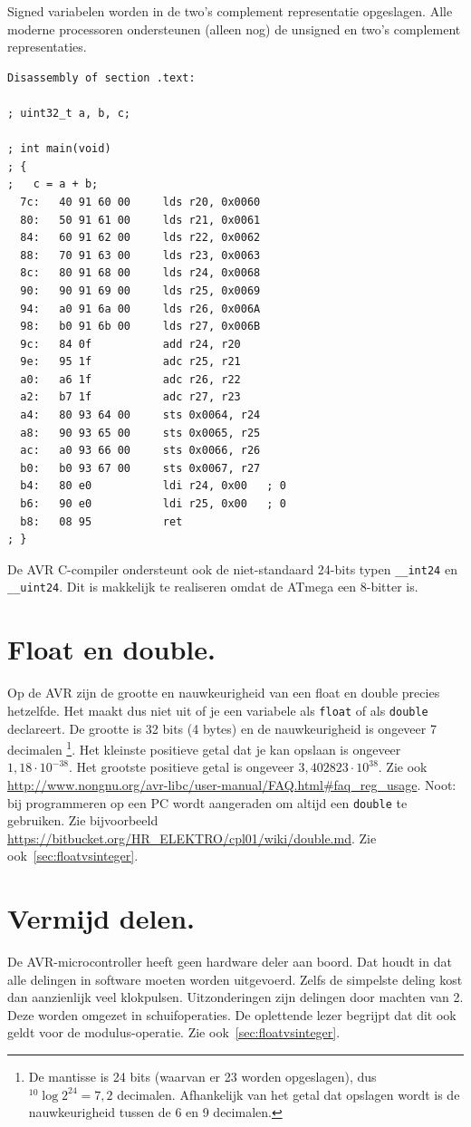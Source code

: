 \documentclass[12pt,a4paper,final,twoside,fleqn]{article}
\def\lstC{\lstinline[style=C]}
\begin{document}
Signed variabelen worden in de two's complement representatie opgeslagen. Alle
moderne processoren ondersteunen (alleen nog) de unsigned en two's complement
representaties.

\newpage
\begin{lstlisting}[style=AVR,caption=32 bits optelling]
Disassembly of section .text:

; uint32_t a, b, c;

; int main(void)
; {
;   c = a + b;
  7c:	40 91 60 00 	lds	r20, 0x0060
  80:	50 91 61 00 	lds	r21, 0x0061
  84:	60 91 62 00 	lds	r22, 0x0062
  88:	70 91 63 00 	lds	r23, 0x0063
  8c:	80 91 68 00 	lds	r24, 0x0068
  90:	90 91 69 00 	lds	r25, 0x0069
  94:	a0 91 6a 00 	lds	r26, 0x006A
  98:	b0 91 6b 00 	lds	r27, 0x006B
  9c:	84 0f       	add	r24, r20
  9e:	95 1f       	adc	r25, r21
  a0:	a6 1f       	adc	r26, r22
  a2:	b7 1f       	adc	r27, r23
  a4:	80 93 64 00 	sts	0x0064, r24
  a8:	90 93 65 00 	sts	0x0065, r25
  ac:	a0 93 66 00 	sts	0x0066, r26
  b0:	b0 93 67 00 	sts	0x0067, r27
  b4:	80 e0       	ldi	r24, 0x00	; 0
  b6:	90 e0       	ldi	r25, 0x00	; 0
  b8:	08 95       	ret
; }
\end{lstlisting}

De AVR C-compiler ondersteunt ook de niet-standaard 24-bits typen \lstC{__int24} en
\mbox{\lstC{__uint24}.} Dit is makkelijk te realiseren omdat de ATmega een 8-bitter is.

\section{Float en double.}
Op de AVR zijn de grootte en nauwkeurigheid van een float en double precies hetzelfde.
Het maakt dus niet uit of je een variabele als \lstC|float| of als \lstC|double|
declareert. De grootte is 32 bits (4 bytes) en de nauwkeurigheid is ongeveer 7 decimalen%
\footnote{De mantisse is 24 bits (waarvan er 23 worden opgeslagen), dus
$^{10}\!\log 2^{24} = 7,2$ decimalen. Afhankelijk van het getal dat opslagen wordt is
de nauwkeurigheid tussen de 6 en 9 decimalen.}.
Het kleinste positieve getal dat je kan opslaan is ongeveer $1,18\cdot10^{-38}$. Het
grootste positieve getal is ongeveer $3,402823\cdot10^{38}$. Zie ook
\url{http://www.nongnu.org/avr-libc/user-manual/FAQ.html#faq_reg_usage}.
Noot: bij programmeren
op een PC wordt aangeraden om altijd een \lstC{double} te gebruiken. Zie bijvoorbeeld
\url{https://bitbucket.org/HR_ELEKTRO/cpl01/wiki/double.md}.
Zie ook~\ref{sec:floatvsinteger}.

\section{Vermijd delen.}
De AVR-microcontroller heeft geen hardware deler aan boord. Dat houdt in dat alle
delingen in software moeten worden uitgevoerd. Zelfs de simpelste deling kost dan
aanzienlijk veel klokpulsen. Uitzonderingen zijn delingen door machten van 2. Deze
worden omgezet in schuifoperaties. De oplettende lezer begrijpt dat dit ook geldt
voor de modulus-operatie. Zie ook~\ref{sec:floatvsinteger}.
\end{document}
